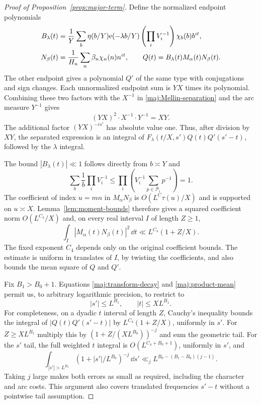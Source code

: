\begin{proof}[Proof of Proposition~\ref{prop:major-term}]
Define the normalized endpoint polynomials
\begin{equation}\label{maj:polynomials}
 \begin{split}
 B_\lambda(t)&=\frac1Y\sum_b\eta(b/Y)\mathrm{e}(-\lambda b/Y)
                 \left(\prod_iV_i^{-1}\right)\chi_b(b)b^{it},\\
 N_\beta(t)&=\frac1{H_n}\sum_n\beta_n\chi_n(n)n^{it},
 \qquad Q(t)=B_\lambda(t)M_\alpha(t)N_\beta(t).
 \end{split}
\end{equation}
The other endpoint gives a polynomial $Q'$ of the same type with
conjugations and sign changes.  Each unnormalized endpoint sum is
$YX$ times its polynomial.  Combining these two factors with the
$X^{-1}$ in \eqref{maj:Mellin-separation} and the arc measure $Y^{-1}$
gives
\begin{equation}\label{maj:XY-normalization}
 (YX)^2\cdot X^{-1}\cdot Y^{-1}=XY.
\end{equation}
The additional factor $(YX)^{-is'}$ has absolute value one.
Thus, after division by $XY$, the separated expression is an
integral of $F_\lambda(t/X,s')Q(t)Q'(s'-t)$, followed by the
$\lambda$ integral.

The bound $|B_\lambda(t)|\ll1$ follows directly from
$b\asymp Y$ and
\[
 \sum_b\frac1b\prod_iV_i^{-1}
 \le\prod_i\left(V_i^{-1}\sum_{p\in\mathcal P_i}p^{-1}\right)=1.
\]
The coefficient of index $u=mn$ in $M_\alpha N_\beta$ is
$O(L^C\tau(u)/X)$ and is supported on $u\asymp X$.
Lemma~\ref{lem:moment-bounds} therefore gives a squared coefficient
norm $O(L^{C_4}/X)$ and, on every real interval $I$ of length
$Z\ge1$,
\begin{equation}\label{maj:product-mean}
 \int_I|M_\alpha(t)N_\beta(t)|^2\,\dd t
       \ll L^{C_4}(1+Z/X).
\end{equation}
The fixed exponent $C_4$ depends only on the original coefficient
bounds.  The estimate is uniform in translates of $I$, by twisting
the coefficients, and also bounds the mean square of $Q$ and $Q'$.

Fix $B_1>B_0+1$.  Equations \eqref{maj:transform-decay} and
\eqref{maj:product-mean} permit us, to arbitrary logarithmic
precision, to restrict to
\begin{equation}\label{maj:retained-rectangle}
 |s'|\le L^{B_1},\qquad |t|\le XL^{B_1}.
\end{equation}
For completeness, on a dyadic $t$ interval of length $Z$,
Cauchy's inequality bounds the integral of
$|Q(t)Q'(s'-t)|$ by $L^{C_4}(1+Z/X)$, uniformly in $s'$.
For $Z\ge XL^{B_1}$ multiply this by
$(1+Z/(XL^{B_0}))^{-j}$ and sum the geometric tail.
For the $s'$ tail, the full weighted $t$ integral is
$O(L^{C_4+B_0+1})$, uniformly in $s'$, and
\[
 \int_{|s'|>L^{B_1}}(1+|s'|/L^{B_0})^{-j}\,\dd s'
 \ll_j L^{B_0-(B_1-B_0)(j-1)}.
\]
Taking $j$ large makes both errors as small as required, including
the character and arc costs.  This argument also covers translated
frequencies $s'-t$ without a pointwise tail assumption.


\end{proof}
